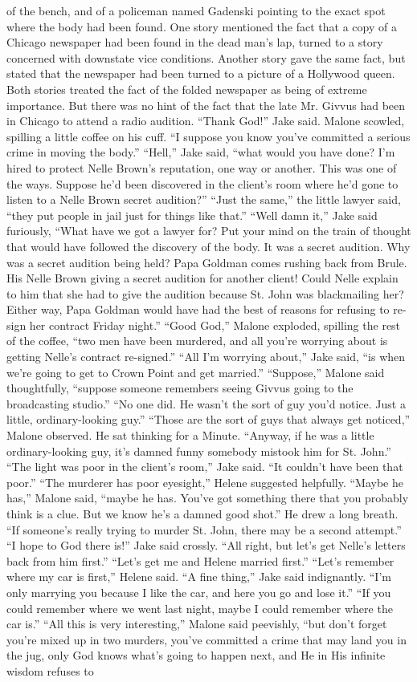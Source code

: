 \documentclass{novel}
\begin{document}
of the bench, and of a policeman named Gadenski pointing to the exact spot where the body had been found. One story mentioned the fact that a copy of a Chicago newspaper had been found in the dead man’s lap, turned to a story concerned with downstate vice conditions. Another story gave the same fact, but stated that the newspaper had been turned to a picture of a Hollywood queen. Both stories treated the fact of the folded newspaper as being of extreme importance. But there was no hint of the fact that the late Mr. Givvus had been in Chicago to attend a radio audition. “Thank God!” Jake said. Malone scowled, spilling a little coffee on his cuff. “I suppose you know you’ve committed a serious crime in moving the body.” “Hell,” Jake said, “what would you have done? I’m hired to protect Nelle Brown’s reputation, one way or another. This was one of the ways. Suppose he’d been discovered in the client’s room where he’d gone to listen to a Nelle Brown secret audition?” “Just the same,” the little lawyer said, “they put people in jail just for things like that.” “Well damn it,” Jake said furiously, “What have we got a lawyer for? Put your mind on the train of thought that would have followed the discovery of the body. It was a secret audition. Why was a secret audition being held? Papa Goldman comes rushing back from Brule. His Nelle Brown giving a secret audition for another client! Could Nelle explain to him that she had to give the audition because St. John was blackmailing her? Either way, Papa Goldman would have had the best of reasons for refusing to re-sign her contract Friday night.” “Good God,” Malone exploded, spilling the rest of the coffee, “two men have been murdered, and all you’re worrying about is getting Nelle’s contract re-signed.” “All I’m worrying about,” Jake said, “is when we’re going to get to Crown Point and get married.” “Suppose,” Malone said thoughtfully, “suppose someone remembers seeing Givvus going to the broadcasting studio.” “No one did. He wasn’t the sort of guy you’d notice. Just a little, ordinary-looking guy.” “Those are the sort of guys that always get noticed,” Malone observed. He sat thinking for a Minute. “Anyway, if he was a little ordinary-looking guy, it’s damned funny somebody mistook him for St. John.” “The light was poor in the client’s room,” Jake said. “It couldn’t have been that poor.” “The murderer has poor eyesight,” Helene suggested helpfully. “Maybe he has,” Malone said, “maybe he has. You’ve got something there that you probably think is a clue. But we know he’s a damned good shot.” He drew a long breath. “If someone’s really trying to murder St. John, there may be a second attempt.” “I hope to God there is!” Jake said crossly. “All right, but let’s get Nelle’s letters back from him first.” “Let’s get me and Helene married first.” “Let’s remember where my car is first,” Helene said. “A fine thing,” Jake said indignantly. “I’m only marrying you because I like the car, and here you go and lose it.” “If you could remember where we went last night, maybe I could remember where the car is.” “All this is very interesting,” Malone said peevishly, “but don’t forget you’re mixed up in two murders, you’ve committed a crime that may land you in the jug, only God knows what’s going to happen next, and He in His infinite wisdom refuses to 
\end{document}
